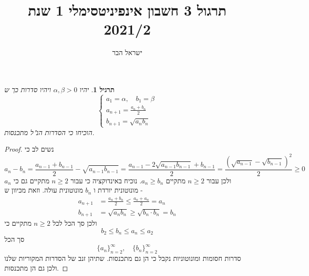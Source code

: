 \documentclass{article}
\begin{document}
\title{תרגול 3 חשבון אינפיניטסימלי 1 שנת 2021/2}
\author{ישראל הבר}
\maketitle

\newtheorem{theorem}{משפט}
\newtheorem{exercise}{תרגיל}
\newtheorem{homeexercise}{תרגיל לבית}
\newtheorem{example}{דוגמה}
\theoremstyle{definition}
\newtheorem{definition}{הגדרה}
\newtheorem{notation}{סימון}
\newtheorem{claim}{טענה}
\renewcommand\qedsymbol{$\blacksquare$}
\newcommand{\limtoinfty}{\underset{n\rightarrow\infty}{\lim}}

\begin{exercise}
יהיו 
$\alpha,\beta>0$
ויהיו סדרות כך ש 
\[\begin{cases} a_1=\alpha,\quad b_1=\beta \\ a_{n+1}=\frac{a_n+b_n}{2} \\ b_{n+1}=\sqrt{a_n b_n} \end{cases}\]
הוכיחו כי הסדרות הנ"ל מתכנסות.
\end{exercise}
\begin{proof}
נשים לב כי 
\[a_n-b_n = \frac{a_{n-1}+b_{n-1}}{2} - \sqrt{a_{n-1}b_{n-1}} = \frac{a_{n-1}-2\sqrt{a_{n-1}b_{n-1}}+b_{n-1}}{2}=\frac{\left(\sqrt{a_{n-1}}-\sqrt{b_{n-1}}\right)^2}{2}\geq 0\]
ולכן עבור 
$n\geq 2$
מתקיים 
$a_n\geq b_n$.
נוכיח באינדוקציה כי עבור 
$n\geq 2$
מתקיים גם כי 
$a_n$
מונוטונית יורדת ו
$b_n$
מונוטונית עולה. וזאת מכיוון ש -
\begin{align*}
	a_{n+1} &= \frac{a_n+b_n}{2}\leq \frac{a_n+a_n}{2} = a_n \\
	b_{n+1} &= \sqrt{a_n b_n} \geq \sqrt{b_n\cdot b_n} = b_n
\end{align*}
ולכן סך הכל לכל 
$n\geq 2$
מתקיים כי
\[b_2\leq b_n\leq a_n\leq a_2\]
סך הכל 
\[\{a_n\}_{n=2}^{\infty},\quad \{b_n\}_{n=2}^{\infty}\]
סדרות חסומות ומונוטוניות נקבל כי הן גם מתכנסות. שתיהן זנב של הסדרות המקוריות שלנו ולכן גם הן מתכנסות.
\end{proof}
\end{document}
